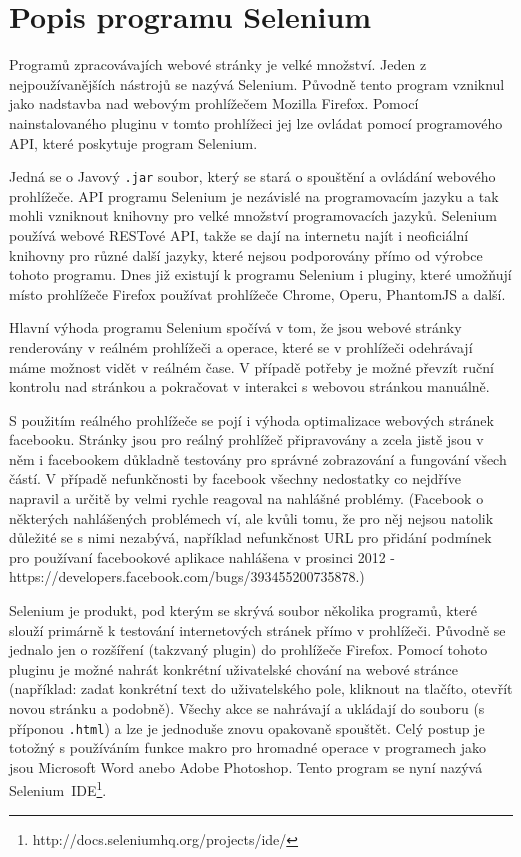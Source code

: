 \documentclass[thesis=M,czech]{FITthesis}[2013/05/10]
\begin{document}
\section{Popis programu Selenium}

Programů zpracovávajích webové stránky je velké množství. Jeden z nejpoužívanějších nástrojů se nazývá Selenium. Původně tento program vzniknul jako nadstavba nad webovým prohlížečem Mozilla Firefox. Pomocí nainstalovaného pluginu v tomto prohlížeci jej lze ovládat pomocí programového API, které poskytuje program Selenium. 

Jedná se o Javový \verb|.jar| soubor, který se stará o spouštění a ovládání webového prohlížeče. API programu Selenium je nezávislé na programovacím jazyku a tak mohli vzniknout knihovny pro velké množství programovacích jazyků. Selenium používá webové RESTové API, takže se dají na internetu najít i neoficiální knihovny pro různé další jazyky, které nejsou podporovány přímo od výrobce tohoto programu. Dnes již existují k programu Selenium i pluginy, které umožňují místo prohlížeče Firefox používat prohlížeče Chrome, Operu, PhantomJS a další.

Hlavní výhoda programu Selenium spočívá v tom, že jsou webové stránky renderovány v reálném prohlížeči a operace, které se v prohlížeči odehrávají máme možnost vidět v reálném čase. V případě potřeby je možné převzít ruční kontrolu nad stránkou a pokračovat v interakci s webovou stránkou manuálně. 

S použitím reálného prohlížeče se pojí i výhoda optimalizace webových stránek facebooku. Stránky jsou pro reálný prohlížeč připravovány a zcela jistě jsou v něm i facebookem důkladně testovány pro správné 
zobrazování a fungování všech částí. V případě nefunkčnosti by facebook všechny nedostatky co nejdříve napravil a určitě by velmi rychle reagoval na nahlášné problémy. (Facebook o některých nahlášených problémech ví, ale kvůli tomu, že pro něj nejsou natolik důležité se s nimi nezabývá, například nefunkčnost URL pro přidání podmínek pro používaní facebookové aplikace  nahlášena v prosinci 2012 -\newline  https://developers.facebook.com/bugs/393455200735878.) 

Selenium je produkt, pod kterým se skrývá soubor několika programů, které slouží primárně k testování internetových stránek přímo v prohlížeči. Původně se jednalo jen o rozšíření (takzvaný plugin) do prohlížeče Firefox. Pomocí tohoto pluginu je možné nahrát konkrétní uživatelské chování na webové stránce (například: zadat konkrétní text do uživatelského pole, kliknout na tlačíto, otevřít novou stránku a podobně). Všechy akce se nahrávají a ukládají do souboru (s příponou \verb|.html|) a lze je jednoduše znovu opakovaně spouštět. Celý postup je totožný s používáním funkce makro pro hromadné operace v programech jako jsou Microsoft Word anebo Adobe Photoshop. Tento program se nyní nazývá Selenium~IDE\footnote{http://docs.seleniumhq.org/projects/ide/}.
\end{document}
